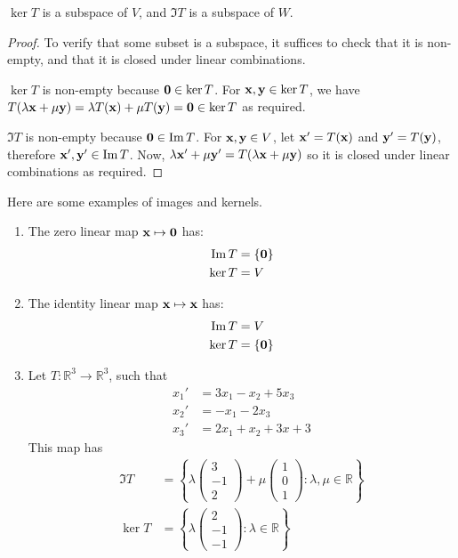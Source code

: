 \begin{lemma}
	\(\ker T\) is a subspace of \(V\), and \(\Im T\) is a subspace of \(W\).
\end{lemma}
\begin{proof}
	To verify that some subset is a subspace, it suffices to check that it is non-empty, and that it is closed under linear combinations.

	\(\ker T\) is non-empty because \(\vb 0 \in \ker T\).
	For \(\vb x, \vb y \in \ker T\), we have \(T(\lambda \vb x + \mu \vb y) = \lambda T(\vb x) + \mu T(\vb y) = \vb 0 \in \ker T\) as required.

	\(\Im T\) is non-empty because \(\vb 0 \in \operatorname{Im} T\).
	For \(\vb x, \vb y \in V\), let \(\vb x' = T(\vb x)\) and \(\vb y' = T(\vb y)\), therefore \(\vb x', \vb y' \in \operatorname{Im} T\).
	Now, \(\lambda \vb x' + \mu \vb y' = T(\lambda \vb x + \mu \vb y)\) so it is closed under linear combinations as required.
\end{proof}
Here are some examples of images and kernels.
\begin{enumerate}
	\item The zero linear map \(\vb x \mapsto \vb 0\) has:
	      \begin{align*}
		      \operatorname{Im} T  & = \{ \vb 0 \} \\
		      \ker T & = V
	      \end{align*}
	\item The identity linear map \(\vb x \mapsto \vb x\) has:
	      \begin{align*}
		      \operatorname{Im} T  & = V           \\
		      \ker T & = \{ \vb 0 \}
	      \end{align*}
	\item Let \(T: \mathbb R^3 \to \mathbb R^3\), such that
	      \begin{align*}
		      x_1' & = 3x_1 - x_2 + 5x_3 \\
		      x_2' & = -x_1 - 2x_3       \\
		      x_3' & = 2x_1 + x_2 + 3x+3
	      \end{align*}
	      This map has
	      \begin{align*}
		      \Im T  & = \left\{ \lambda \begin{pmatrix} 3 \\ -1 \\ 2 \end{pmatrix} + \mu \begin{pmatrix} 1 \\ 0 \\ 1 \end{pmatrix} : \lambda, \mu \in \mathbb R \right\} \\
		      \ker T & = \left\{ \lambda \begin{pmatrix} 2 \\ -1 \\ -1 \end{pmatrix} : \lambda \in \mathbb R \right\}
	      \end{align*}
\end{enumerate}

